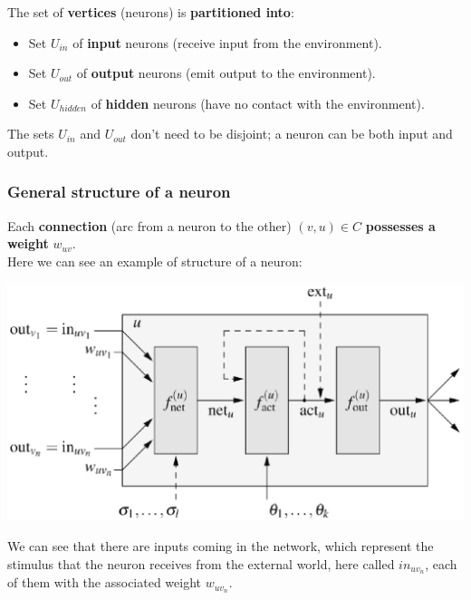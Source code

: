 \documentclass[11pt]{article}
\begin{document}
		The set of \textbf{vertices} (neurons) is \textbf{partitioned into}: 
		\begin{itemize}
			\item Set $U_{in}$ of \textbf{input} neurons (receive input from the environment).\\
			
			\item Set $U_{out}$ of \textbf{output} neurons (emit output to the environment).\\
			
			\item Set $U_{hidden}$ of \textbf{hidden} neurons (have no contact with the environment).\\
			
		\end{itemize}
		The sets $U_{in}$ and $U_{out}$ don't need to be disjoint; a neuron can be both input and output.\\
		
		
		
		\subsubsection{General structure of a neuron}
		Each \textbf{connection} (arc from a neuron to the other) $(v,u) \in C$ \textbf{possesses a weight} $w_{uv}$.\\
		
		Here we can see an example of structure of a neuron:
		\begin{center}
			\includegraphics[width=0.9\columnwidth]{img/NN/neuron1}
		\end{center}
		
		\newpage
		
		We can see that there are inputs coming in the network, which represent the stimulus that the neuron receives from the external world, here called $in_{uv_n}$, each of them with the associated weight $w_{uv_n}$.\\
		
\end{document}
